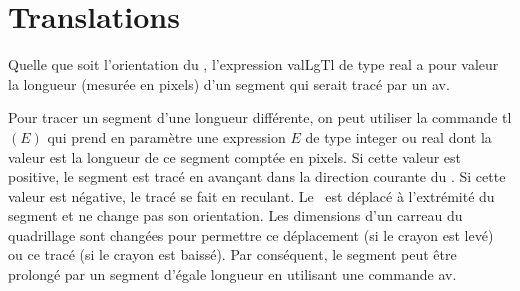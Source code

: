\section{Translations}
Quelle que soit l'orientation du \robot, l'expression  {\idt valLgTl} de type {\idt real} a pour valeur la longueur
 (mesurée en pixels) d'un segment qui serait tracé par un {\idt av}. 
 
 Pour tracer un segment d'une longueur différente, on peut utiliser la commande {\idt tl$(E)$} qui 
 prend en paramètre une expression $E$ de type {\idt integer} ou {\idt real} dont la valeur est la 
 longueur de ce segment 
 comptée en pixels. Si cette valeur est positive, le segment est tracé en avançant dans la 
 direction courante du \robot. Si cette valeur est négative, le tracé se fait en reculant. Le \robot\
 est déplacé à l'extrémité du segment et ne change pas son orientation. Les dimensions
 d'un carreau du quadrillage sont changées pour permettre ce déplacement (si le crayon est levé)
 ou ce tracé (si le crayon est baissé). Par conséquent, le segment peut être prolongé
 par un segment d'égale longueur en utilisant une commande {\idt av}.
 
